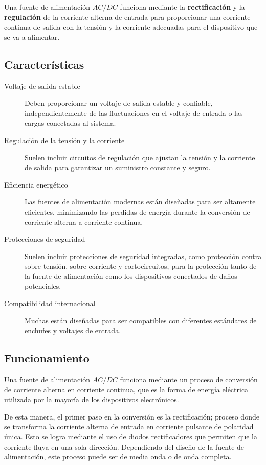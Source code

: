 \documentclass[letter,twoside,11pt]{article}
\begin{document}
Una fuente de alimentación $AC/DC$ funciona mediante la \textbf{rectificación} y
la \textbf{regulación} de la corriente alterna de entrada para proporcionar una
corriente continua de salida con la tensión y la corriente adecuadas para el
dispositivo que se va a alimentar.

\subsection{Características}

\begin{description}
    \item [Voltaje de salida estable] Deben proporcionar un voltaje de salida
    estable y confiable, independientemente de las fluctuaciones en el voltaje
    de entrada o las cargas conectadas al sistema.
    \item [Regulación de la tensión y la corriente] Suelen incluir circuitos de
    regulación que ajustan la tensión y la corriente de salida para garantizar
    un suministro constante y seguro.
    \item [Eficiencia energético] Las fuentes de alimentación modernas están
    diseñadas para ser altamente eficientes, minimizando las perdidas de energía
    durante la conversión de corriente alterna a corriente continua.
    \item [Protecciones de seguridad] Suelen incluir protecciones de seguridad
    integradas, como protección contra sobre-tensión, sobre-corriente y
    cortocircuitos, para la protección tanto de la fuente de alimentación como
    los dispositivos conectados de daños potenciales.
    \item [Compatibilidad internacional] Muchas están diseñadas para ser
    compatibles con diferentes estándares de enchufes y voltajes de entrada.
\end{description}

\subsection{Funcionamiento}
Una fuente de alimentación $AC/DC$ funciona mediante un proceso de conversión de
corriente alterna en corriente continua, que es la forma de energía eléctrica
utilizada por la mayoría de los dispositivos electrónicos.

De esta manera, el primer paso en la conversión es la rectificación; proceso
donde se transforma la corriente alterna de entrada en corriente pulsante de
polaridad única. Esto se logra mediante el uso de diodos rectificadores que
permiten que la corriente fluya en una sola dirección. Dependiendo del diseño de
la fuente de alimentación, este proceso puede ser de media onda o de onda
completa.
\end{document}
